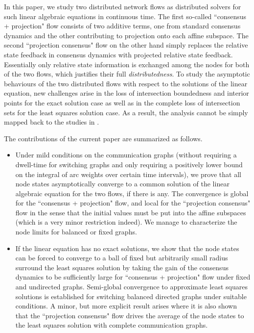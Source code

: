 \documentclass[a4paper, 11pt]{article}
\begin{document}
In this paper, we study two distributed network flows as distributed solvers for such linear algebraic equations in continuous time. The first so-called ``consensus + projection" flow consists of two additive  terms, one from standard consensus dynamics and the other contributing to projection onto each affine subspace. The second ``projection consensus" flow on the other hand simply replaces the relative state feedback in consensus dynamics with projected relative state feedback. Essentially only relative state information is exchanged among the nodes for both of the two flows, which justifies their full {\it distributedness}.  To study the asymptotic behaviours of the two distributed flows with respect to the solutions of the linear equation, new challenges arise in the loss of intersection boundedness and interior points for the exact solution case as well as in the complete loss of intersection sets for the least squares solution case. As a result, the analysis cannot be simply mapped back to the studies in \cite{nedic10,shitac}.

The contributions of the current paper are summarized as follows.

\begin{itemize}
\item Under mild conditions on the communication graphs (without requiring a  dwell-time for switching graphs and  only  requiring a  positively lower bound on the integral of arc weights over certain time intervals), we prove that all node states asymptotically converge to a common solution of the linear algebraic equation for the two flows, if there is any. The convergence is global for the ``consensus + projection" flow, and local for the ``projection consensus" flow in the sense that the initial values must be put into the affine subspaces  (which is a very minor restriction indeed). We manage to characterize the node limits for balanced or fixed graphs.

\item If the linear equation has no exact solutions, we show that the node states can be forced to converge to a ball of fixed but arbitrarily small radius surround the  least squares solution by taking  the gain of the consensus dynamics to be sufficiently large for ``consensus + projection" flow under fixed and undirected graphs. Semi-global convergence to approximate least squares solutions is established  for switching balanced directed graphs under suitable conditions.  A minor, but more explicit result arises where it is also shown that the ``projection consensus" flow drives the average of the node states to the least squares solution with complete communication graphs.
\end{itemize}
\end{document}

